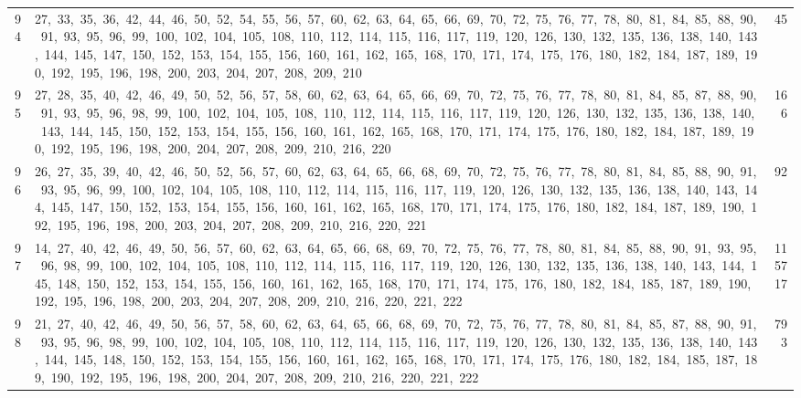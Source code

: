 \begin{longtable}{c|p{}|r}
94 & 27,\ 33,\ 35,\ 36,\ 42,\ 44,\ 46,\ 50,\ 52,\ 54,\ 55,\ 56,\ 57,\ 60,\ 62,\ 63,\ 64,\ 65,\ 66,\ 69,\ 70,\ 72,\ 75,\ 76,\ 77,\ 78,\ 80,\ 81,\ 84,\ 85,\ 88,\ 90,\ 91,\ 93,\ 95,\ 96,\ 99,\ 100,\ 102,\ 104,\ 105,\ 108,\ 110,\ 112,\ 114,\ 115,\ 116,\ 117,\ 119,\ 120,\ 126,\ 130,\ 132,\ 135,\ 136,\ 138,\ 140,\ 143,\ 144,\ 145,\ 147,\ 150,\ 152,\ 153,\ 154,\ 155,\ 156,\ 160,\ 161,\ 162,\ 165,\ 168,\ 170,\ 171,\ 174,\ 175,\ 176,\ 180,\ 182,\ 184,\ 187,\ 189,\ 190,\ 192,\ 195,\ 196,\ 198,\ 200,\ 203,\ 204,\ 207,\ 208,\ 209,\ 210 & 45 \\
95 & 27,\ 28,\ 35,\ 40,\ 42,\ 46,\ 49,\ 50,\ 52,\ 56,\ 57,\ 58,\ 60,\ 62,\ 63,\ 64,\ 65,\ 66,\ 69,\ 70,\ 72,\ 75,\ 76,\ 77,\ 78,\ 80,\ 81,\ 84,\ 85,\ 87,\ 88,\ 90,\ 91,\ 93,\ 95,\ 96,\ 98,\ 99,\ 100,\ 102,\ 104,\ 105,\ 108,\ 110,\ 112,\ 114,\ 115,\ 116,\ 117,\ 119,\ 120,\ 126,\ 130,\ 132,\ 135,\ 136,\ 138,\ 140,\ 143,\ 144,\ 145,\ 150,\ 152,\ 153,\ 154,\ 155,\ 156,\ 160,\ 161,\ 162,\ 165,\ 168,\ 170,\ 171,\ 174,\ 175,\ 176,\ 180,\ 182,\ 184,\ 187,\ 189,\ 190,\ 192,\ 195,\ 196,\ 198,\ 200,\ 204,\ 207,\ 208,\ 209,\ 210,\ 216,\ 220 & 166 \\
96 & 26,\ 27,\ 35,\ 39,\ 40,\ 42,\ 46,\ 50,\ 52,\ 56,\ 57,\ 60,\ 62,\ 63,\ 64,\ 65,\ 66,\ 68,\ 69,\ 70,\ 72,\ 75,\ 76,\ 77,\ 78,\ 80,\ 81,\ 84,\ 85,\ 88,\ 90,\ 91,\ 93,\ 95,\ 96,\ 99,\ 100,\ 102,\ 104,\ 105,\ 108,\ 110,\ 112,\ 114,\ 115,\ 116,\ 117,\ 119,\ 120,\ 126,\ 130,\ 132,\ 135,\ 136,\ 138,\ 140,\ 143,\ 144,\ 145,\ 147,\ 150,\ 152,\ 153,\ 154,\ 155,\ 156,\ 160,\ 161,\ 162,\ 165,\ 168,\ 170,\ 171,\ 174,\ 175,\ 176,\ 180,\ 182,\ 184,\ 187,\ 189,\ 190,\ 192,\ 195,\ 196,\ 198,\ 200,\ 203,\ 204,\ 207,\ 208,\ 209,\ 210,\ 216,\ 220,\ 221 & 92 \\
97 & 14,\ 27,\ 40,\ 42,\ 46,\ 49,\ 50,\ 56,\ 57,\ 60,\ 62,\ 63,\ 64,\ 65,\ 66,\ 68,\ 69,\ 70,\ 72,\ 75,\ 76,\ 77,\ 78,\ 80,\ 81,\ 84,\ 85,\ 88,\ 90,\ 91,\ 93,\ 95,\ 96,\ 98,\ 99,\ 100,\ 102,\ 104,\ 105,\ 108,\ 110,\ 112,\ 114,\ 115,\ 116,\ 117,\ 119,\ 120,\ 126,\ 130,\ 132,\ 135,\ 136,\ 138,\ 140,\ 143,\ 144,\ 145,\ 148,\ 150,\ 152,\ 153,\ 154,\ 155,\ 156,\ 160,\ 161,\ 162,\ 165,\ 168,\ 170,\ 171,\ 174,\ 175,\ 176,\ 180,\ 182,\ 184,\ 185,\ 187,\ 189,\ 190,\ 192,\ 195,\ 196,\ 198,\ 200,\ 203,\ 204,\ 207,\ 208,\ 209,\ 210,\ 216,\ 220,\ 221,\ 222 & 115717 \\
98 & 21,\ 27,\ 40,\ 42,\ 46,\ 49,\ 50,\ 56,\ 57,\ 58,\ 60,\ 62,\ 63,\ 64,\ 65,\ 66,\ 68,\ 69,\ 70,\ 72,\ 75,\ 76,\ 77,\ 78,\ 80,\ 81,\ 84,\ 85,\ 87,\ 88,\ 90,\ 91,\ 93,\ 95,\ 96,\ 98,\ 99,\ 100,\ 102,\ 104,\ 105,\ 108,\ 110,\ 112,\ 114,\ 115,\ 116,\ 117,\ 119,\ 120,\ 126,\ 130,\ 132,\ 135,\ 136,\ 138,\ 140,\ 143,\ 144,\ 145,\ 148,\ 150,\ 152,\ 153,\ 154,\ 155,\ 156,\ 160,\ 161,\ 162,\ 165,\ 168,\ 170,\ 171,\ 174,\ 175,\ 176,\ 180,\ 182,\ 184,\ 185,\ 187,\ 189,\ 190,\ 192,\ 195,\ 196,\ 198,\ 200,\ 204,\ 207,\ 208,\ 209,\ 210,\ 216,\ 220,\ 221,\ 222 & 793 \\

\end{longtable}
